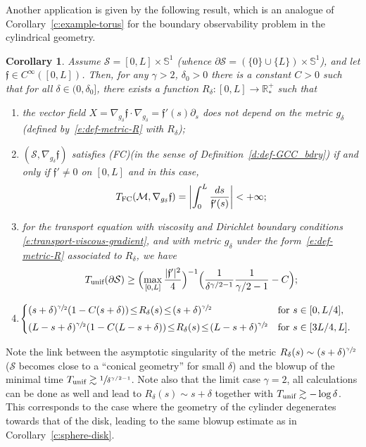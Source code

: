 \documentclass[10pt]{amsart}
\newcommand{\FC}{\textup{FC}}
\newcommand{\pFC}{\textup{(FC)}\xspace}
\newcommand{\unif}{\textup{unif}}
\newtheorem{corollary}[lemma]{Corollary}
\theoremstyle{definition}
\newcommand{\M}{\ensuremath{\mathcal M}}
\newcommand{\calS}{\ensuremath{\mathcal S}}
\newcommand{\mb}[1]{\ensuremath{\mathbb{#1}}}
\newcommand{\R}{{\mb{R}}}
\newcommand{\bS}{\ensuremath{\mathbb S}}
\newcommand{\f}{\ensuremath{\mathfrak{f}}}
\let\d\partial
\begin{document}
\pagebreak[2]
Another application is given by the following result, which is an analogue of Corollary~\ref{c:example-torus} for the boundary observability problem in the cylindrical geometry.
\begin{corollary}
\label{c:example-cylinder}
Assume $\calS=[0,L]\times\bS^1$ (whence $\d\calS = (\{0\}\cup\{L\})\times\bS^1$), and let $\f\in C^{\infty}([0,L])$. Then, for any $\gamma >2$, $\delta_0>0$ there is a constant $C>0$ such that for all $\delta \in (0,\delta_0]$, there exists a function $R_\delta: [0,L]\to\R^+_*$ such that
\begin{enumerate}
\item the vector field $X= \nabla_{g_\delta}\f \cdot \nabla_{g_\delta} = \f'(s) \d_s$ does not depend on the metric $g_\delta$ (defined by~\eqref{e:def-metric-R} with $R_\delta$);
\item $(\calS,\nabla_{g_\delta}\f)$ satisfies \pFC (in the sense of Definition~\ref{d:def-GCC_bdry}) if and only if $\f' \neq 0$ on $[0,L]$ and in this case,
\[
T_{\FC}(\M,\nabla_{g_\delta}\f) = \biggl| \int_0^L \frac{ds}{\f'(s)} \biggr| <+\infty ;
\]
\item for the transport equation with viscosity and Dirichlet boundary conditions \eqref{e:transport-viscous-gradient}, and with metric $g_\delta$ under the form~\eqref{e:def-metric-R} associated to $R_\delta$, we have
\[
T_{\unif}(\d\calS) \geq \Bigl(\max_{[0,L]}\frac{|\f'|^2}{4} \Bigr)^{-1} \Bigl( \frac{1}{\delta^{\gamma/2-1}}\frac{1}{\gamma/2-1} - C \Bigr);
\]
\item \label{itemdelta}
$\hspace*{-1mm}\begin{cases}
(s+\delta)^{\sfrac{\gamma}{2}} (1-C (s+\delta)) \!\leq\! R_\delta(s) \!\leq\! (s+\delta)^{\sfrac{\gamma}{2}}& \text{for }s\in [0,L/4],\\[3pt]
(L-s+\delta)^{\sfrac{\gamma}{2}} (1-C (L-s+\delta)) \!\leq\! R_\delta(s) \!\leq\! (L-s+\delta)^{\sfrac{\gamma}{2}}&\text{for }s\in [3L/4,L].
\end{cases}$
\end{enumerate}
\end{corollary}
Note the link between the asymptotic singularity of the metric $R_\delta(s) \sim (s+\delta)^{\sfrac{\gamma}{2}}$ (\ie $\calS$ becomes close to a ``conical geometry'' for small $\delta$) and the blowup of the minimal time $T_{\unif} \gtrsim\sfrac{1}{\delta^{\gamma/2-1}}$. Note also that the limit case $\gamma =2$, all calculations can be done as well and lead to $R_\delta(s) \sim s+\delta$ together with $T_{\unif}\gtrsim -\log \delta$. This corresponds to the case where the geometry of the cylinder degenerates towards that of the disk, leading to the same blowup estimate as in Corollary~\ref{c:sphere-disk}.
\end{document}
